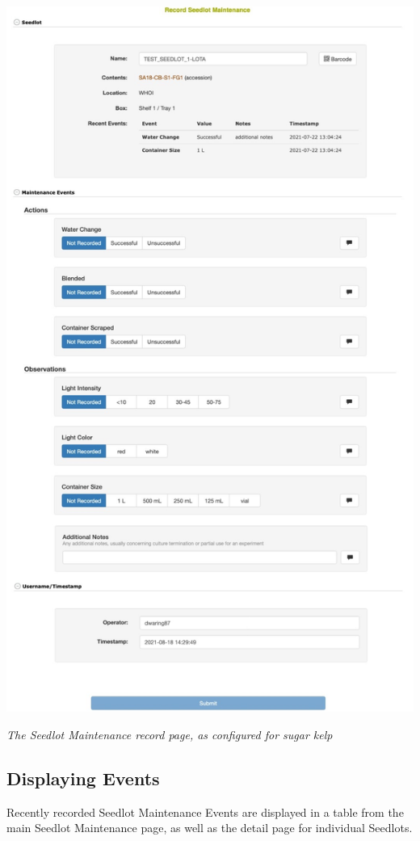\documentclass[
  12pt,
]{book}
\begin{document}
\begin{center}\includegraphics[width=0.95\linewidth]{assets/images/seedlot_maintenance_record} \end{center}

\emph{The Seedlot Maintenance record page, as configured for sugar kelp}

\hypertarget{displaying-events}{%
\subsection{Displaying Events}\label{displaying-events}}

Recently recorded Seedlot Maintenance Events are displayed in a table from the main Seedlot Maintenance page, as well as the detail page for individual Seedlots.
\end{document}
